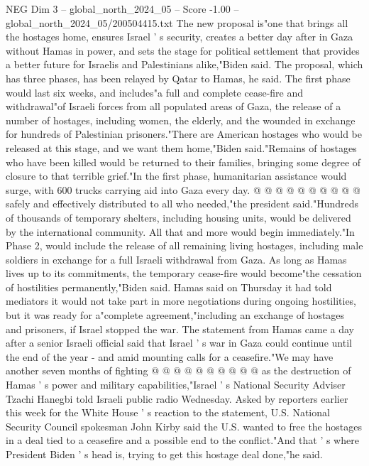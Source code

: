 \begin{textsample}{NEG Dim 3 – global\_north\_2024\_05 – Score -1.00 – global\_north\_2024\_05/200504415.txt}  \label{ex:f3_neg_440}
The new proposal is"one that brings all the hostages home, ensures Israel ' s security, creates a better day after in Gaza without Hamas in power, and sets the stage for political settlement that provides a better future for Israelis and Palestinians alike,"Biden said.
The proposal, which has three phases, has been relayed by Qatar to Hamas, he said.
The first phase would last six weeks, and includes"a full and complete cease-fire and withdrawal"of Israeli forces from all populated areas of Gaza, the release of a number of hostages, including women, the elderly, and the wounded in exchange for hundreds of Palestinian prisoners."There are American hostages who would be released at this stage, and we want them home,"Biden said."Remains of hostages who have been killed would be returned to their families, bringing some degree of closure to that terrible grief."In the first phase, humanitarian assistance would surge, with 600 trucks carrying aid into Gaza every day. @ @ @ @ @ @ @ @ @ @ safely and effectively distributed to all who needed,"the president said."Hundreds of thousands of temporary shelters, including housing units, would be delivered by the international community.
All that and more would begin immediately."In Phase 2, would include the release of all remaining living hostages, including male soldiers in exchange for a full Israeli withdrawal from Gaza.
As long as Hamas lives up to its commitments, the temporary cease-fire would become"the cessation of hostilities permanently,"Biden said.
Hamas said on Thursday it had told mediators it would not take part in more negotiations during ongoing hostilities, but it was ready for a"complete agreement,"including an exchange of hostages and prisoners, if Israel stopped the war.
The statement from Hamas came a day after a senior Israeli official said that Israel ' s war in Gaza could continue until the end of the year - and amid mounting calls for a ceasefire."We may have another seven months of fighting @ @ @ @ @ @ @ @ @ @ as the destruction of Hamas ' s power and military capabilities,"Israel ' s National Security Adviser Tzachi Hanegbi told Israeli public radio Wednesday.
Asked by reporters earlier this week for the White House ' s reaction to the statement, U.S.
National Security Council spokesman John Kirby said the U.S. wanted to free the hostages in a deal tied to a ceasefire and a possible end to the conflict."And that ' s where President Biden ' s head is, trying to get this hostage deal done,"he said.

\end{textsample}
